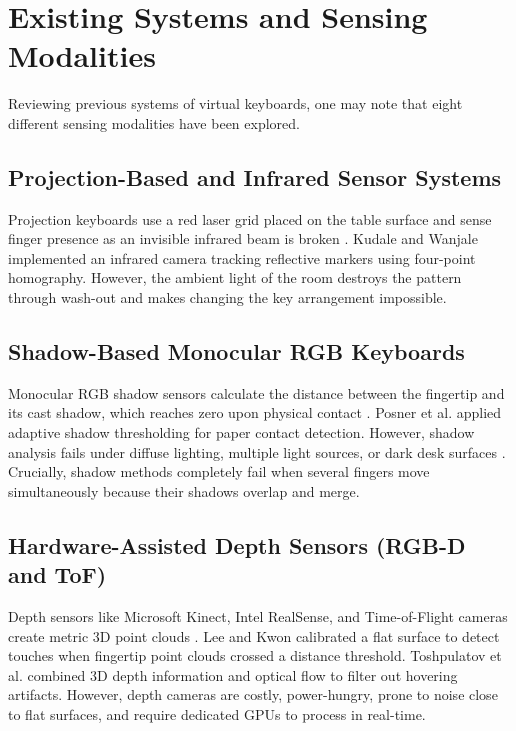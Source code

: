 \section{Existing Systems and Sensing Modalities}
\label{sec:lit_existing_systems}
Reviewing previous systems of virtual keyboards, one may note that eight different sensing modalities have been explored.

\subsection{Projection-Based and Infrared Sensor Systems}
\label{subsec:lit_proj_systems}
Projection keyboards use a red laser grid placed on the table surface and sense finger presence as an invisible infrared beam is broken \cite{Cheng2015Fingertip, Kudale2016RealTime}. Kudale and Wanjale \cite{Kudale2016RealTime} implemented an infrared camera tracking reflective markers using four-point homography. However, the ambient light of the room destroys the pattern through wash-out and makes changing the key arrangement impossible.

\subsection{Shadow-Based Monocular RGB Keyboards}
\label{subsec:lit_shadow_systems}
Monocular RGB shadow sensors calculate the distance between the fingertip and its cast shadow, which reaches zero upon physical contact \cite{Thomas2013Camera, Posner2012Single, Yue2014Blind}. Posner et al. \cite{Posner2012Single} applied adaptive shadow thresholding for paper contact detection. However, shadow analysis fails under diffuse lighting, multiple light sources, or dark desk surfaces \cite{Yue2014Blind}. Crucially, shadow methods completely fail when several fingers move simultaneously because their shadows overlap and merge.

\subsection{Hardware-Assisted Depth Sensors (RGB-D and ToF)}
\label{subsec:lit_depth_systems}
Depth sensors like Microsoft Kinect, Intel RealSense, and Time-of-Flight cameras create metric 3D point clouds \cite{Lee2019Virtual, Toshpulatov2024RealTime}. Lee and Kwon \cite{Lee2019Virtual} calibrated a flat surface to detect touches when fingertip point clouds crossed a distance threshold. Toshpulatov et al. \cite{Toshpulatov2024RealTime} combined 3D depth information and optical flow to filter out hovering artifacts. However, depth cameras are costly, power-hungry, prone to noise close to flat surfaces, and require dedicated GPUs to process in real-time.

